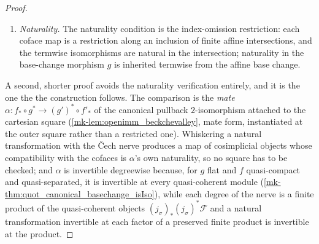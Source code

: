 \begin{proof}
\begin{enumerate}
      model the comparison IS the affine termwise base change
      \ref{mk-lem:affine_pushforward_pullback_baseChange} (via
      \ref{mk-lem:cech_degree_affine_baseChange}), assembled from the concrete tilde
      dictionaries \ref{mk-lem:pushforward_spec_tilde_iso} and
      \ref{mk-lem:pullback_spec_tilde_iso} with the commutative-algebra cancellation
      \(\operatorname{cancelBaseChange}\) (\ref{mk-lem:cancelBaseChange_mathlib}) --- not the
      canonical adjoint mate.
    \item \emph{Naturality.} The naturality condition is the index-omission
      restriction: each coface map is a restriction along an inclusion of finite affine
      intersections, and the termwise isomorphisms are natural in the intersection;
      naturality in the base-change morphism \(g\) is inherited termwise from the affine
      base change.
  \end{enumerate}

  A second, shorter proof avoids the naturality verification entirely, and it is the one the
  the construction follows. The comparison is the \emph{mate} \(\alpha : f_* \circ g^* \to (g')^*
  \circ f'_*\) of the canonical pullback \(2\)-isomorphism attached to the cartesian square
  (\ref{mk-lem:openimm_beckchevalley}, mate form, instantiated at the outer square rather than a
  restricted one). Whiskering a natural transformation with the {\v C}ech nerve produces a map of
  cosimplicial objects whose compatibility with the cofaces is \(\alpha\)'s own naturality, so no
  square has to be checked; and \(\alpha\) is invertible degreewise because, for \(g\) flat and
  \(f\) quasi-compact and quasi-separated, it is invertible at every quasi-coherent module
  (\ref{mk-thm:quot_canonical_basechange_isIso}), while each degree of the nerve is a finite product of
  the quasi-coherent objects \((j_\sigma)_*(j_\sigma)^*\mathcal{F}\) and a natural transformation
  invertible at each factor of a preserved finite product is invertible at the product.
\end{proof}

